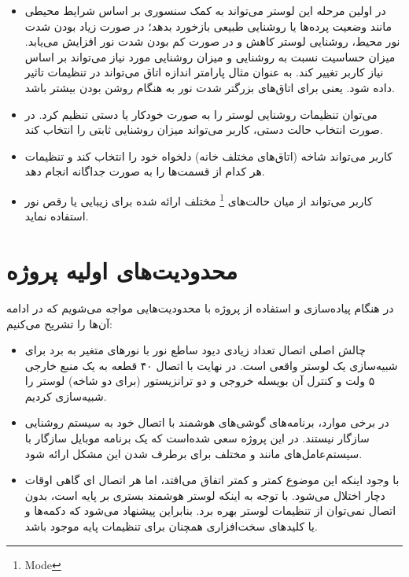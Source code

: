 \documentclass[12pt,a4paper]{article}
\begin{document}
	\begin{itemize}
		\item
		در اولین مرحله این لوستر می‌تواند به کمک سنسوری بر اساس شرایط محیطی مانند وضعیت پرده‌ها یا روشنایی طبیعی بازخورد بدهد؛ در صورت زیاد بودن شدت نور محیط، روشنایی لوستر کاهش و در صورت کم بودن شدت نور افزایش می‌یابد. میزان حساسیت نسبت به روشنایی و میزان روشنایی مورد نیاز می‌تواند بر اساس نیاز کاربر تغییر کند. به عنوان مثال پارامتر‌ اندازه اتاق می‌تواند در تنظیمات تاثیر داده شود. یعنی برای اتاق‌های بزرگتر شدت نور به هنگام روشن بودن بیشتر باشد. 
		\item
		می‌توان تنظیمات روشنایی لوستر را به صورت خودکار یا دستی تنظیم کرد. در صورت انتخاب حالت دستی، کاربر می‌تواند میزان روشنایی ثابتی را انتخاب کند.
		\item
		کاربر می‌تواند شاخه (اتاق‌های مختلف خانه) دلخواه خود را انتخاب کند و تنظیمات هر کدام از قسمت‌ها را به صورت جداگانه انجام دهد.
		\item
		کاربر می‌تواند از میان حالت‌های‌ \footnote{Mode} مختلف ارائه شده برای زیبایی یا رقص نور استفاده نماید.
	\end{itemize}
	
	\section{محدودیت‌های اولیه پروژه}
	
	در هنگام پیاده‌سازی و استفاده از پروژه با محدودیت‌هایی مواجه می‌شویم که در ادامه آن‌ها را تشریح می‌کنیم:
	
	\begin{itemize}
		\item
		چالش اصلی اتصال تعداد زیادی دیود ساطع نور  با نورهای متغیر به برد برای شبیه‌سازی یک لوستر واقعی است. در نهایت با اتصال ۴۰ قطعه  به یک منبع خارجی ۵ ولت و کنترل آن بویسله خروجی  و دو ترانزیستور (برای دو شاخه) لوستر را شبیه‌سازی کردیم.
		\item
		در برخی موارد، برنامه‌های گوشی‌های هوشمند با اتصال خود به سیستم روشنایی سازگار نیستند. در این پروژه سعی شده‌است که یک برنامه موبایل سازگار با سیستم‌عامل‌های مانند و  مختلف برای برطرف شدن این مشکل ارائه شود.
		\item
		با وجود اینکه این موضوع کمتر و کمتر اتفاق می‌افتد، اما هر اتصال ‌ای گاهی اوقات دچار اختلال می‌شود. با توجه به اینکه لوستر هوشمند بستری بر پایه  است، بدون اتصال  نمی‌توان از تنظیمات لوستر بهره برد. بنابراین پیشنهاد می‌شود که دکمه‌ها و یا کلید‌های سخت‌افزاری همچنان برای تنظیمات پایه‌ موجود باشد.
	\end{itemize}
	
\end{document}
